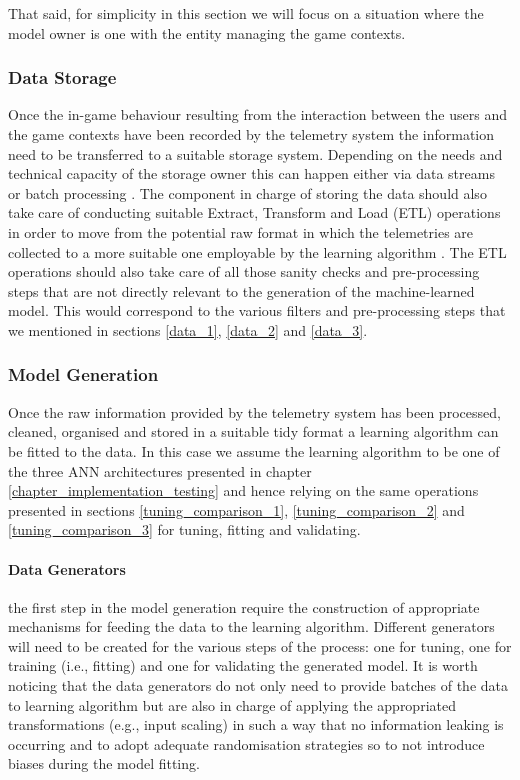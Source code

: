 That said, for simplicity in this section we will focus on a situation where the model owner is one with the entity managing the game contexts.

\subsubsection{Data Storage}
Once the in-game behaviour resulting from the interaction between the users and the game contexts have been recorded by the telemetry system the information need to be transferred to a suitable storage system. Depending on the needs and technical capacity of the storage owner this can happen either via data streams or batch processing \cite{el2016game}. The component in charge of storing the data should also take care of conducting suitable Extract, Transform and Load (ETL) operations in order to move from the potential raw format in which the telemetries are collected to a more suitable one employable by the learning algorithm \cite{el2016game}. The ETL operations should also take care of all those sanity checks and pre-processing steps that are not directly relevant to the generation of the machine-learned model. This would correspond to the various filters and pre-processing steps that we mentioned in sections \ref{data_1}, \ref{data_2} and \ref{data_3}.

\subsubsection{Model Generation}
Once the raw information provided by the telemetry system has been processed, cleaned, organised and stored in a suitable tidy format a learning algorithm can be fitted to the data. In this case we assume the learning algorithm to be one of the three ANN architectures presented in chapter \ref{chapter_implementation_testing} and hence relying on the same operations presented in sections \ref{tuning_comparison_1}, \ref{tuning_comparison_2} and \ref{tuning_comparison_3} for tuning, fitting and validating.

\paragraph*{Data Generators} the first step in the model generation require the construction of appropriate mechanisms for feeding the data to the learning algorithm. Different generators will need to be created for the various steps of the process: one for tuning, one for training (i.e., fitting) and one for validating the generated model. It is worth noticing that the data generators do not only need to provide batches of the data to learning algorithm but are also in charge of applying the appropriated transformations (e.g., input scaling) in such a way that no information leaking is occurring and to adopt adequate randomisation strategies so to not introduce biases during the model fitting.

